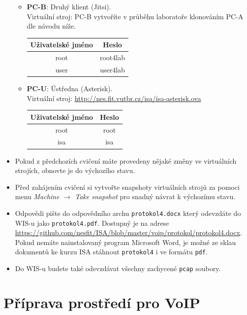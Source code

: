 \begin{itemize}
\begin{itemize}
	\item \textbf{PC-B}: Druhý klient (Jitsi).\\
	Virtuální stroj: PC-B vytvoříte v průběhu laboratoře klonováním PC-A dle návodu níže.
	\begin{table}[H]
		\centering
		\begin{tabular}{|c|c|}
		\hline
		\textbf{Uživatelské jméno} & \textbf{Heslo} \\ \hline
		root                       & root4lab       \\ \hline
		user                       & user4lab       \\ \hline
		\end{tabular}
	\end{table}
	\item \textbf{PC-U}: Ústředna (Asterisk).\\
	Virtuální stroj: \url{http://nes.fit.vutbr.cz/isa/isa-asterisk.ova}
	\begin{table}[H]
		\centering
		\begin{tabular}{|c|c|}
		\hline
		\textbf{Uživatelské jméno} & \textbf{Heslo} \\ \hline
		root                       & root       \\ \hline
		isa                       & isa       \\ \hline
		\end{tabular}
	\end{table}
  \end{itemize}
  \item Pokud z předchozích cvičení máte provedeny nějaké změny ve virtuálních strojích, obnovte je do výchozího stavu.
  \item Před zahájením cvičení si vytvořte snapshoty virtuálních strojů za pomoci
  menu \textit{Machine $\rightarrow$ Take snapshot} pro snadný návrat k výchozímu stavu.
  \item Odpovědi pište do odpovědního archu \texttt{protokol4.docx} který odevzdáte do WIS-u jako \texttt{protokol4.pdf}.
  Dostupný je na adrese \url{https://github.com/nesfit/ISA/blob/master/voip/protokol/protokol4.docx}.
  Pokud nemáte nainstalovaný program Microsoft Word, je možné ze sklau dokumentů ke kurzu ISA stáhnout \texttt{protokol4} i ve formátu \texttt{pdf}.
  \item Do WIS-u budete také odevzdávat všechny zachycené \texttt{pcap} soubory.
\end{itemize}


\section{Příprava prostředí pro VoIP}

